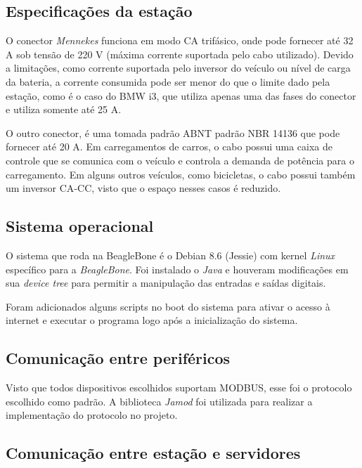     \subsection{Especificações da estação}
    \label{methodology:structure:specs}

      O conector \textit{Mennekes} funciona em modo \ac{CA} trifásico, onde pode fornecer até 32 A sob tensão de 220 V (máxima corrente suportada pelo cabo utilizado). Devido a limitações, como corrente suportada pelo inversor do veículo ou nível de carga da bateria, a corrente consumida pode ser menor do que o limite dado pela estação, como é o caso do BMW i3, que utiliza apenas uma das fases do conector e utiliza somente até 25 A. 

      O outro conector, é uma tomada padrão ABNT padrão NBR 14136 \cite{nbr-14136} que pode fornecer até 20 A. Em carregamentos de carros, o cabo possui uma caixa de controle que se comunica com o veículo e controla a demanda de potência para o carregamento. Em alguns outros veículos, como bicicletas, o cabo possui também um inversor \ac{CA}-\ac{CC}, visto que o espaço nesses casos é reduzido.

    \subsection{Sistema operacional}
    \label{methodology:structure:os}

      O sistema que roda na BeagleBone é o Debian 8.6 (Jessie) com kernel \textit{Linux} específico para a \textit{BeagleBone}. Foi instalado o \textit{Java} e houveram modificações em sua \textit{device tree} para permitir a manipulação das entradas e saídas digitais.

      Foram adicionados alguns scripts no boot do sistema para ativar o acesso à internet e executar o programa logo após a inicialização do sistema.

    \subsection{Comunicação entre periféricos}
    \label{methodology:structure:com}

      Visto que todos dispositivos escolhidos suportam MODBUS, esse foi o protocolo escolhido como padrão. A biblioteca \textit{Jamod} foi utilizada para realizar a implementação do protocolo no projeto.

    \subsection{Comunicação entre estação e servidores}
    \label{methodology:structure:ocpp}

